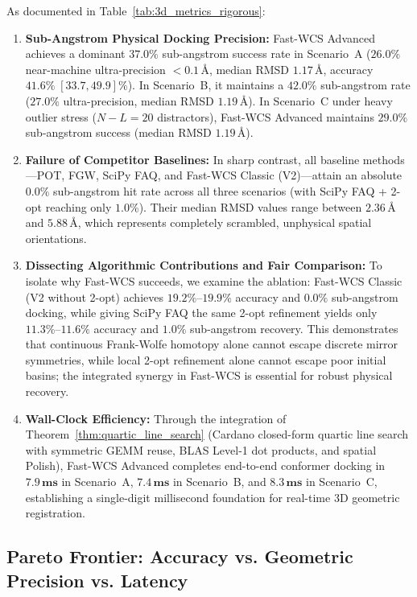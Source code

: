 \documentclass[conference]{IEEEtran}
\begin{document}
As documented in Table~\ref{tab:3d_metrics_rigorous}:
\begin{enumerate}
    \item \textbf{Sub-Angstrom Physical Docking Precision:} Fast-WCS Advanced achieves a dominant $\mathbf{37.0\%}$ sub-angstrom success rate in Scenario~A ($26.0\%$ near-machine ultra-precision $< 0.1\,\text{\AA}$, median RMSD $1.17\,\text{\AA}$, accuracy $41.6\% \; [33.7, 49.9]\%$). In Scenario~B, it maintains a $\mathbf{42.0\%}$ sub-angstrom rate ($27.0\%$ ultra-precision, median RMSD $1.19\,\text{\AA}$). In Scenario~C under heavy outlier stress ($N - L = 20$ distractors), Fast-WCS Advanced maintains $\mathbf{29.0\%}$ sub-angstrom success (median RMSD $1.19\,\text{\AA}$).
    \item \textbf{Failure of Competitor Baselines:} In sharp contrast, all baseline methods---POT, FGW, SciPy FAQ, and Fast-WCS Classic (V2)---attain an absolute $\mathbf{0.0\%}$ sub-angstrom hit rate across all three scenarios (with SciPy FAQ + 2-opt reaching only $1.0\%$). Their median RMSD values range between $2.36\,\text{\AA}$ and $5.88\,\text{\AA}$, which represents completely scrambled, unphysical spatial orientations.
    \item \textbf{Dissecting Algorithmic Contributions and Fair Comparison:} To isolate why Fast-WCS succeeds, we examine the ablation: Fast-WCS Classic (V2 without 2-opt) achieves $19.2\%\text{--}19.9\%$ accuracy and $0.0\%$ sub-angstrom docking, while giving SciPy FAQ the same 2-opt refinement yields only $11.3\%\text{--}11.6\%$ accuracy and $1.0\%$ sub-angstrom recovery. This demonstrates that continuous Frank-Wolfe homotopy alone cannot escape discrete mirror symmetries, while local 2-opt refinement alone cannot escape poor initial basins; the integrated synergy in Fast-WCS is essential for robust physical recovery.
    \item \textbf{Wall-Clock Efficiency:} Through the integration of Theorem~\ref{thm:quartic_line_search} (Cardano closed-form quartic line search with symmetric GEMM reuse, BLAS Level-1 dot products, and spatial Polish), Fast-WCS Advanced completes end-to-end conformer docking in $\mathbf{7.9\,\text{ms}}$ in Scenario~A, $\mathbf{7.4\,\text{ms}}$ in Scenario~B, and $\mathbf{8.3\,\text{ms}}$ in Scenario~C, establishing a single-digit millisecond foundation for real-time 3D geometric registration.
\end{enumerate}

\subsection{Pareto Frontier: Accuracy vs. Geometric Precision vs. Latency}
\end{document}
